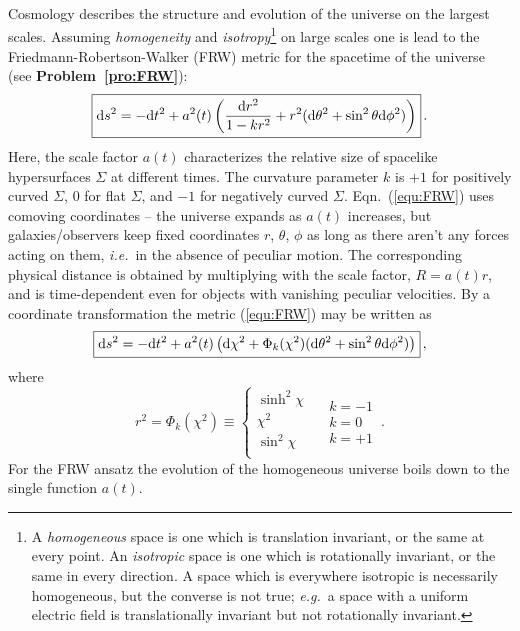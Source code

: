 \documentclass[12pt,letterpaper,rotate]{article}
\def\beq{\begin{equation}}
\def\eeq{\end{equation}}
\def\d{{\rm d}}
\begin{document}
{Cosmology describes the structure and evolution of the universe on the largest scales. Assuming
{\it homogeneity} and {\it isotropy}\footnote{A {\it homogeneous} space is one which is translation invariant, or the same at every point. An {\it isotropic} space is one which is rotationally invariant, or the same in every direction. A space which is everywhere isotropic is necessarily homogeneous, but the converse is not true; {\it e.g.}~a space with a uniform electric field is translationally invariant but not rotationally invariant.} on large scales one is lead to the Friedmann-Robertson-Walker (FRW) metric for the spacetime of the universe (see {\bf Problem~\ref{pro:FRW}}):
\beq
\label{equ:FRW}
\fbox{$\displaystyle
\d s^2 = - \d t^2 + a^2(t)  \left(\frac{\d r^2}{1-k r^2} + r^2 (\d \theta^2 + \sin^2 \theta \d \phi^2) \right) $}\, .
\eeq
Here, the scale factor $a(t)$ characterizes the relative size of spacelike hypersurfaces $\Sigma$ at different times. The curvature parameter $k$ is $+1$ for positively curved $\Sigma$, $0$ for flat $\Sigma$, and $-1$ for negatively curved $\Sigma$.
Eqn.~(\ref{equ:FRW}) uses comoving coordinates -- the universe expands as $a(t)$ increases, but galaxies/observers keep fixed coordinates
$r$, $\theta$, $\phi$ as long as there aren't any forces acting on them, {\it i.e.}~in the absence of peculiar motion.
The corresponding physical distance is obtained by multiplying with the scale factor, $R=a(t) r$, and is time-dependent even for objects with vanishing peculiar velocities.
By a coordinate transformation the metric (\ref{equ:FRW}) may be written as
\beq
\label{equ:FRW2}
\fbox{$\displaystyle
\d s^2 = - \d t^2 + a^2(t)  \left(\d \chi^2 + \Phi_k(\chi^2) (\d \theta^2 + \sin^2 \theta \d \phi^2) \right) $}\, ,
\eeq
where
\beq
r^2 = \Phi_k(\chi^2) \equiv  \left\{
\begin{array}{c} \sinh^2 \chi \\ \chi^2 \\ \sin^2 \chi \\
\end{array} \right. \quad \begin{array}{l} k=-1 \\ k=0 \\ k=+1 \end{array}\, .
\eeq
For the FRW ansatz the evolution of the homogeneous universe boils down to the single function $a(t)$.
}
\end{document}
